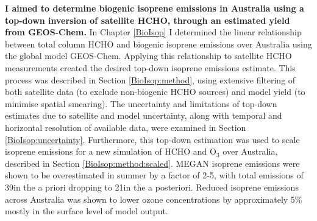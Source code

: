    
  \textbf{I aimed to determine biogenic isoprene emissions in Australia using a top-down inversion of satellite HCHO, through an estimated yield from GEOS-Chem.}
  In Chapter \ref{BioIsop} I determined the linear relationship between total column HCHO and biogenic isoprene emissions over Australia using the global model GEOS-Chem.
  Applying this relationship to satellite HCHO measurements created the desired top-down isoprene emissions estimate.
  This process was described in Section \ref{BioIsop:method}, using extensive filtering of both satellite data (to exclude non-biogenic HCHO sources) and model yield (to minimise spatial smearing).
  The uncertainty and limitations of top-down estimates due to satellite and model uncertainty, along with temporal and horizontal resolution of available data, were examined in Section \ref{BioIsop:uncertainty}.
  Furthermore, this top-down estimation was used to scale isoprene emissions for a new simulation of HCHO and O$_3$ over Australia, described in Section \ref{BioIsop:method:scaled}.
  MEGAN isoprene emissions were shown to be overestimated in summer by a factor of 2-5, with total emissions of 39\tgpyr in the a priori dropping to 21\tgpyr in the a posteriori.
  Reduced isoprene emissions across Australia was shown to lower ozone concentrations by approximately 5\% mostly in the surface level of model output.
   
